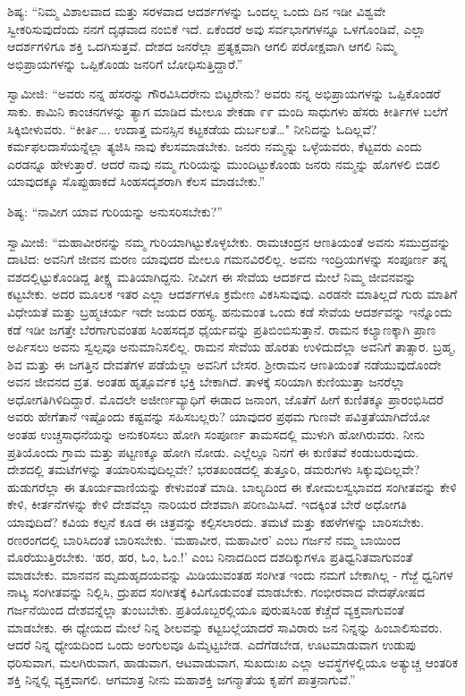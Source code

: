  ಶಿಷ್ಯ: “ನಿಮ್ಮ ವಿಶಾಲವಾದ ಮತ್ತು ಸರಳವಾದ ಆದರ್ಶಗಳನ್ನು ಒಂದಲ್ಲ ಒಂದು ದಿನ ಇಡೀ ವಿಶ್ವವೇ ಸ್ವೀಕರಿಸುವುದೆಂದು ನನಗೆ ದೃಢವಾದ ನಂಬಿಕೆ ಇದೆ. ಏಕೆಂದರೆ ಅವು ಸರ್ವಭಾಗಗಳನ್ನೂ ಒಳಗೊಂಡಿವೆ, ಎಲ್ಲಾ ಆದರ್ಶಗಳಿಗೂ ಶಕ್ತಿ ಒದಗಿಸುತ್ತವೆ. ದೇಶದ ಜನರೆಲ್ಲಾ ಪ್ರತ್ಯಕ್ಷವಾಗಿ ಆಗಲಿ ಪರೋಕ್ಷವಾಗಿ ಆಗಲಿ ನಿಮ್ಮ ಅಭಿಪ್ರಾಯಗಳನ್ನು ಒಪ್ಪಿಕೊಂಡು ಜನರಿಗೆ ಬೋಧಿಸುತ್ತಿದ್ದಾರೆ.” 

 ಸ್ವಾಮೀಜಿ: “ಅವರು ನನ್ನ ಹೆಸರನ್ನು ಗೌರವಿಸಿದರೇನು ಬಿಟ್ಟರೇನು? ಅವರು ನನ್ನ ಅಭಿಪ್ರಾಯಗಳನ್ನು ಒಪ್ಪಿಕೊಂಡರೆ ಸಾಕು. ಕಾಮಿನಿ ಕಾಂಚನಗಳನ್ನು ತ್ಯಾಗ ಮಾಡಿದ ಮೇಲೂ ಶೇಕಡಾ ೯೯ ಮಂದಿ ಸಾಧುಗಳು ಹೆಸರು ಕೀರ್ತಿಗಳ ಬಲೆಗೆ ಸಿಕ್ಕಿಬೀಳುವರು. “ಕೀರ್ತಿ…. ಉದಾತ್ತ ಮನಸ್ಸಿನ ಕಟ್ಟಕಡೆಯ ದುರ್ಬಲತೆ…" ನೀನಿದನ್ನು ಓದಿಲ್ಲವೆ? ಕರ್ಮಫಲದಾಸೆಯನ್ನೆಲ್ಲಾ ತ್ಯಜಿಸಿ ನಾವು ಕೆಲಸಮಾಡಬೇಕು. ಜನರು ನಮ್ಮನ್ನು ಒಳ್ಳೆಯವರು, ಕೆಟ್ಟವರು ಎಂದು ಎರಡನ್ನೂ ಹೇಳುತ್ತಾರೆ. ಆದರೆ ನಾವು ನಮ್ಮ ಗುರಿಯನ್ನು ಮುಂದಿಟ್ಟುಕೊಂಡು ಜನರು ನಮ್ಮನ್ನು ಹೊಗಳಲಿ ಬಿಡಲಿ ಯಾವುದಕ್ಕೂ ಸೊಪ್ಪುಹಾಕದೆ ಸಿಂಹಸದೃಶರಾಗಿ ಕೆಲಸ ಮಾಡಬೇಕು.” 

 ಶಿಷ್ಯ: “ನಾವೀಗ ಯಾವ ಗುರಿಯನ್ನು ಅನುಸರಿಸಬೇಕು?” 

 ಸ್ವಾಮೀಜಿ: “ಮಹಾವೀರನನ್ನು ನಮ್ಮ ಗುರಿಯಾಗಿಟ್ಟುಕೊಳ್ಳಬೇಕು. ರಾಮಚಂದ್ರನ ಆಣತಿಯಂತೆ ಅವನು ಸಮುದ್ರವನ್ನು ದಾಟಿದ: ಅವನಿಗೆ ಜೀವನ ಮರಣ ಯಾವುದರ ಮೇಲೂ ಗಮನವಿರಲಿಲ್ಲ. ಅವನು ಇಂದ್ರಿಯಗಳನ್ನು ಸಂಪೂರ್ಣ ತನ್ನ ವಶದಲ್ಲಿಟ್ಟುಕೊಂಡಿದ್ದ ತೀಕ್ಷ್ಣ ಮತಿಯಾಗಿದ್ದನು. ನೀವೀಗ ಈ ಸೇವೆಯ ಆದರ್ಶದ ಮೇಲೆ ನಿಮ್ಮ ಜೀವನವನ್ನು ಕಟ್ಟಬೇಕು. ಅದರ ಮೂಲಕ ಇತರ ಎಲ್ಲಾ ಆದರ್ಶಗಳೂ ಕ್ರಮೇಣ ವಿಕಸಿಸುವುವು. ಎರಡನೇ ಮಾತಿಲ್ಲದೆ ಗುರು ಮಾತಿಗೆ ವಿಧೇಯತೆ ಮತ್ತು ಬ್ರಹ್ಮಚರ್ಯ ಇದೇ ಜಯದ ರಹಸ್ಯ. ಹನುಮಂತ ಒಂದು ಕಡೆ ಸೇವೆಯ ಆದರ್ಶವನ್ನು ಇನ್ನೊಂದು ಕಡೆ ಇಡೀ ಜಗತ್ತೇ ಬೆರಗಾಗುವಂತಹ ಸಿಂಹಸದೃಶ ಧೈರ್ಯವನ್ನು ಪ್ರತಿಬಿಂಬಿಸುತ್ತಾನೆ. ರಾಮನ ಕಲ್ಯಾಣಕ್ಕಾಗಿ ಪ್ರಾಣ ಅರ್ಪಿಸಲು ಅವನು ಸ್ವಲ್ಪವೂ ಅನುಮಾನಿಸಲಿಲ್ಲ. ರಾಮನ ಸೇವೆಯ ಹೊರತು ಉಳಿದುದೆಲ್ಲಾ ಅವನಿಗೆ ತಾತ್ಸಾರ. ಬ್ರಹ್ಮ, ಶಿವ ಮತ್ತು ಈ ಜಗತ್ತಿನ ದೇವತೆಗಳ ಪಡೆಯೆಲ್ಲಾ ಅವನಿಗೆ ಬೇಸರ. ಶ‍್ರೀರಾಮನ ಆಣತಿಯಂತೆ ನಡೆಯುವುದೊಂದೇ ಅವನ ಜೀವನದ ವ್ರತ. ಅಂತಹ ಹೃತ್ಪೂರ್ವಕ ಭಕ್ತಿ ಬೇಕಾಗಿದೆ. ತಾಳಕ್ಕೆ ಸರಿಯಾಗಿ ಕುಣಿಯುತ್ತಾ ಜನರೆಲ್ಲಾ ಅಧೋಗತಿಗಿಳಿದಿದ್ದಾರೆ. ಮೊದಲೇ ಅಜೀರ್ಣವ್ಯಾಧಿಗೆ ಈಡಾದ ಜನಾಂಗ, ಜೊತೆಗೆ ಹೀಗೆ ಕುಣಿತಕ್ಕೂ‌ ಪ್ರಾರಂಭಿಸಿದರೆ ಅವರು ಹೇಗೆತಾನೆ ಇಷ್ಟೊಂದು ಕಷ್ಟವನ್ನು ಸಹಿಸಬಲ್ಲರು? ಯಾವುದರ ಪ್ರಥಮ ಗುಣವೇ ಪವಿತ್ರತೆಯಾಗಿದೆಯೋ ಅಂತಹ ಉಚ್ಚಸಾಧನೆಯನ್ನು ಅನುಕರಿಸಲು ಹೋಗಿ ಸಂಪೂರ್ಣ ತಾಮಸದಲ್ಲಿ ಮುಳುಗಿ ಹೋಗಿರುವರು. ನೀನು ಪ್ರತಿಯೊಂದು ಗ್ರಾಮ ಮತ್ತು ಪಟ್ಟಣಕ್ಕೂ ಹೋಗಿ ನೋಡು. ಎಲ್ಲೆಲ್ಲೂ ನಿನಗೆ ಈ ಕುಣಿತವೆ ಕಂಡುಬರುವುದು. ದೇಶದಲ್ಲಿ ತಮಟೆಗಳನ್ನು ತಯಾರಿಸುವುದಿಲ್ಲವೇ? ಭರತಖಂಡದಲ್ಲಿ ತುತ್ತೂರಿ, ಡಮರುಗಳು ಸಿಕ್ಕುವುದಿಲ್ಲವೇ? ಹುಡುಗರೆಲ್ಲಾ ಈ ತೂರ್ಯವಾಣಿಯನ್ನು ಕೇಳುವಂತೆ ಮಾಡಿ. ಬಾಲ್ಯದಿಂದ ಈ ಕೋಮಲಸ್ವಭಾವದ ಸಂಗೀತವನ್ನು ಕೇಳಿ ಕೇಳಿ, ಕೀರ್ತನೆಗಳನ್ನು ಕೇಳಿ ದೇಶವೆಲ್ಲಾ ನಾರಿಯರ ದೇಶವಾಗಿ ಪರಿಣಮಿಸಿದೆ. ಇದಕ್ಕಿಂತ ಬೇರೆ ಅಧೋಗತಿ ಯಾವುದಿದೆ? ಕವಿಯ ಕಲ್ಪನೆ ಕೂಡ ಈ ಚಿತ್ರವನ್ನು ಕಲ್ಪಿಸಲಾರದು. ತಮಟೆ ಮತ್ತು ಕಹಳೆಗಳನ್ನು ಬಾರಿಸಬೇಕು. ರಣರಂಗದಲ್ಲಿ ಬಾರಿಸಿದಂತೆ ಬಾರಿಸಬೇಕು. ‘ಮಹಾವೀರ, ಮಹಾವೀರ’ ಎಂಬ ಗರ್ಜನೆ ನಮ್ಮ ಬಾಯಿಂದ ಮೊರೆಯುತ್ತಿರಬೇಕು. ‘ಹರ, ಹರ, ಓಂ, ಓಂ.!’ ಎಂಬ ನಿನಾದದಿಂದ ದಶದಿಕ್ಕುಗಳೂ ಪ್ರತಿಧ್ವನಿತವಾಗುವಂತೆ ಮಾಡಬೇಕು. ಮಾನವನ ಮೃದುಹೃದಯವನ್ನು ಮಿಡಿಯುವಂತಹ ಸಂಗೀತ ಇಂದು ನಮಗೆ ಬೇಕಾಗಿಲ್ಲ - ಗೆಜ್ಜೆ ಧ್ವನಿಗಳ ನಾಟ್ಯ ಸಂಗೀತವನ್ನು ನಿಲ್ಲಿಸಿ, ದ್ರುಪದ ಸಂಗೀತಕ್ಕೆ ಕಿವಿಗೊಡುವಂತೆ ಮಾಡಬೇಕು. ಗಂಭೀರವಾದ ವೇದಘೋಷದ ಗರ್ಜನೆಯಿಂದ ದೇಶವನ್ನೆಲ್ಲಾ ತುಂಬಬೇಕು. ಪ್ರತಿಯೊಬ್ಬರಲ್ಲಿಯೂ ಪುರುಷಸಿಂಹ ಕೆಚ್ಚೆದೆ ವ್ಯಕ್ತವಾಗುವಂತೆ ಮಾಡಬೇಕು. ಈ ಧ್ಯೇಯದ ಮೇಲೆ ನಿನ್ನ ಶೀಲವನ್ನು ಕಟ್ಟಬಲ್ಲೆಯಾದರೆ ಸಾವಿರಾರು ಜನ ನಿನ್ನನ್ನು ಹಿಂಬಾಲಿಸುವರು. ಆದರೆ ನಿನ್ನ ಧ್ಯೇಯದಿಂದ ಒಂದು ಅಂಗುಲವೂ ಹಿಮ್ಮೆಟ್ಟಬೇಡ. ಎದೆಗೆಡಬೇಡ, ಊಟಮಾಡುವಾಗ ಉಡುಪು ಧರಿಸುವಾಗ, ಮಲಗಿರುವಾಗ, ಹಾಡುವಾಗ, ಆಟವಾಡುವಾಗ, ಸುಖದುಃಖ ಎಲ್ಲಾ ಅವಸ್ಥೆಗಳಲ್ಲಿಯೂ ಅತ್ಯುಚ್ಚ ಆಂತರಿಕ ಶಕ್ತಿ ನಿನ್ನಲ್ಲಿ ವ್ಯಕ್ತವಾಗಲಿ. ಆಗಮಾತ್ರ ನೀನು ಮಹಾಶಕ್ತಿ ಜಗನ್ಮಾತೆಯ ಕೃಪೆಗೆ ಪಾತ್ರನಾಗುವೆ.” 

